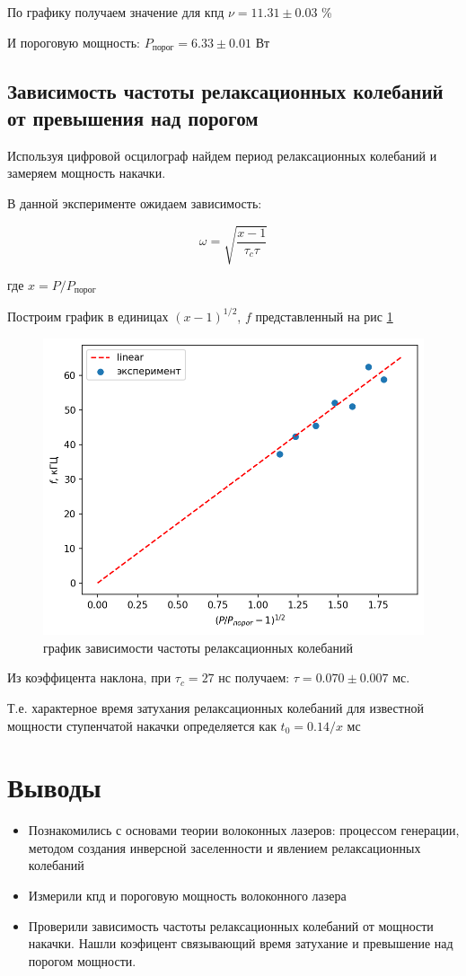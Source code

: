 \documentclass[a4paper]{article}
\begin{document}
По графику получаем значение для кпд $\nu = 11.31 \pm 0.03 $ \% \par
И пороговую мощность: $P_{\text{порог}} = 6.33 \pm 0.01$ Вт

\subsection{Зависимость частоты релаксационных колебаний от превышения над порогом}

Используя цифровой осцилограф найдем период релаксационных колебаний и замеряем мощность накачки.

В данной эксперименте ожидаем зависимость:

\begin{equation}
\omega = \sqrt{\frac{x-1}{\tau_c \tau}}
\end{equation}

где $x = P/P_{\text{порог}}$

Построим график в единицах $(x-1)^{1/2}$, $f$ представленный на рис \ref{fig:x_vs_f}

\begin{figure}[H]
\centering
\includegraphics[width=0.5\linewidth]{x_vs_f.png}
\caption{график зависимости частоты релаксационных колебаний}
\label{fig:x_vs_f}
\end{figure}

Из коэффицента наклона, при $\tau_c = 27$ нс получаем: $\tau = 0.070 \pm 0.007$ мс.

Т.е. характерное время затухания релаксационных колебаний для известной мощности ступенчатой накачки определяется как $t_0 = 0.14/x$ мс
\newpage
\section{Выводы}
\begin{itemize}
\item Познакомились с основами теории волоконных лазеров: процессом генерации, методом создания инверсной заселенности и явлением релаксационных колебаний
\item  Измерили кпд и пороговую мощность волоконного лазера
\item Проверили зависимость частоты релаксационных колебаний от мощности накачки. Нашли коэфицент связывающий время затухание и превышение над порогом мощности.
\end{itemize}
\end{document}
